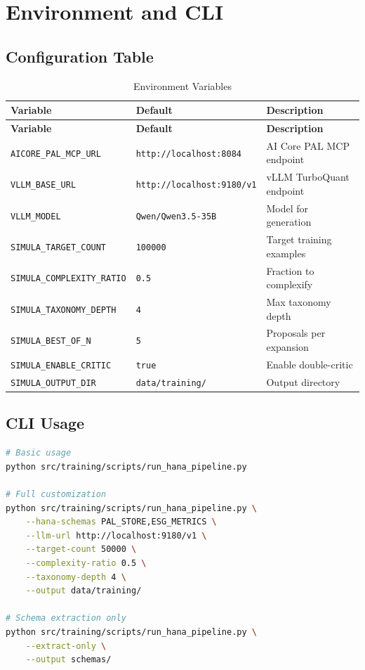 \chapter{Environment and CLI}
\label{chap:config}

\section{Configuration Table}

\begin{longtable}{p{5cm}p{3cm}p{6cm}}
\caption{Environment Variables} \\
\toprule
\textbf{Variable} & \textbf{Default} & \textbf{Description} \\
\midrule
\endfirsthead
\toprule
\textbf{Variable} & \textbf{Default} & \textbf{Description} \\
\midrule
\endhead
\texttt{AICORE\_PAL\_MCP\_URL} & \texttt{http://localhost:8084} & AI Core PAL MCP endpoint \\
\texttt{VLLM\_BASE\_URL} & \texttt{http://localhost:9180/v1} & vLLM TurboQuant endpoint \\
\texttt{VLLM\_MODEL} & \texttt{Qwen/Qwen3.5-35B} & Model for generation \\
\texttt{SIMULA\_TARGET\_COUNT} & \texttt{100000} & Target training examples \\
\texttt{SIMULA\_COMPLEXITY\_RATIO} & \texttt{0.5} & Fraction to complexify \\
\texttt{SIMULA\_TAXONOMY\_DEPTH} & \texttt{4} & Max taxonomy depth \\
\texttt{SIMULA\_BEST\_OF\_N} & \texttt{5} & Proposals per expansion \\
\texttt{SIMULA\_ENABLE\_CRITIC} & \texttt{true} & Enable double-critic \\
\texttt{SIMULA\_OUTPUT\_DIR} & \texttt{data/training/} & Output directory \\
\bottomrule
\end{longtable}

\section{CLI Usage}

\begin{lstlisting}[language=bash,caption={CLI entry point}]
# Basic usage
python src/training/scripts/run_hana_pipeline.py

# Full customization
python src/training/scripts/run_hana_pipeline.py \
    --hana-schemas PAL_STORE,ESG_METRICS \
    --llm-url http://localhost:9180/v1 \
    --target-count 50000 \
    --complexity-ratio 0.5 \
    --taxonomy-depth 4 \
    --output data/training/

# Schema extraction only
python src/training/scripts/run_hana_pipeline.py \
    --extract-only \
    --output schemas/
\end{lstlisting}

